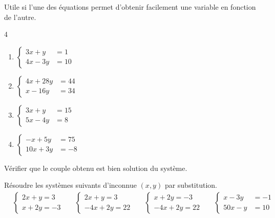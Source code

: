\documentclass[main.tex]{subfiles}
\begin{document}
\begin{example} Utile si l'une des équations permet d'obtenir facilement une variable en fonction de l'autre.\vspace{-1em}
	\begin{multicols}{4}
		\begin{enumerate}[leftmargin =*,label={$S_\arabic*$}] 
			\item 
			$\begin{cases}
				3x +y & = 1 \\
				4x-3y&=10
			\end{cases}$ 
			\item $\begin{cases}
				4x +28y & = 44 \\
				x-16y&=34
			\end{cases}$  
			\item  $\begin{cases}
				3x +y & = 15 \\
				5x-4y&=8
			\end{cases}$
			\item 	$\begin{cases}
				-x+5y & = 75 \\
				10x+3y&=-8
			\end{cases}$
		\end{enumerate}
	\end{multicols} 
\end{example}
\begin{tBox}
	Vérifier que le couple obtenu est bien solution du système.
\end{tBox}
\begin{exercise} 
	Résoudre les systèmes suivants d'inconnue $(x,y)$ par substitution. \vspace{-1em}
	\begin{align*}
		&\begin{cases}
			2x + y = 3\\
			x + 2y = -3
		\end{cases} 
		&&  
		\begin{cases}
			2x + y = 3\\
			-4x + 2y= 22
		\end{cases}
		&&
		\begin{cases}
			x + 2y = -3\\
			-4x + 2y= 22
		\end{cases}
		&&
		\begin{cases}
			x-3y & = -1 \\
			50x-y&=10
		\end{cases}
	\end{align*}  
\end{exercise}
\end{document}
